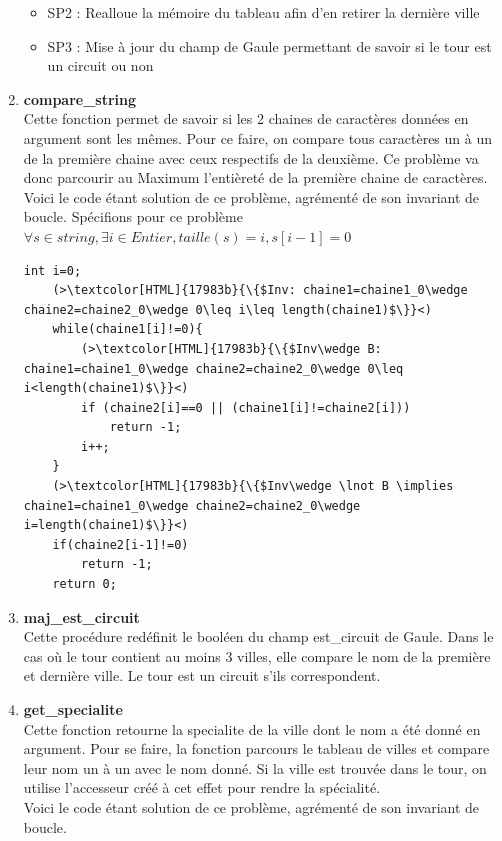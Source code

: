\documentclass[a4paper, 11pt, oneside]{article}
\begin{document}
\begin{enumerate}
\begin{itemize}
        \item SP2 : Realloue la mémoire du tableau afin d'en retirer la dernière ville
        \item SP3 : Mise à jour du champ de Gaule permettant de savoir si le tour est un circuit ou non
    \end{itemize}
    \item \textbf{compare\_string}
    \\Cette fonction permet de savoir si les 2 chaines de caractères données en argument 
    sont les mêmes. Pour ce faire, on compare tous caractères un à un de la première chaine 
    avec ceux respectifs de la deuxième.
    Ce problème va donc parcourir au Maximum l'entièreté de la première chaine de caractères.
    \\Voici le code étant solution de ce problème, agrémenté de son invariant de boucle.
    Spécifions pour ce problème $\forall s\in string, \exists i\in Entier, taille(s)=i, s[i-1]=0$
    \newpage 
    \begin{lstlisting}[caption = {code comparaison de 2 chaines de caractères}]
    int i=0;
    (>\textcolor[HTML]{17983b}{\{$Inv: chaine1=chaine1_0\wedge chaine2=chaine2_0\wedge 0\leq i\leq length(chaine1)$\}}<)
    while(chaine1[i]!=0){
        (>\textcolor[HTML]{17983b}{\{$Inv\wedge B: chaine1=chaine1_0\wedge chaine2=chaine2_0\wedge 0\leq i<length(chaine1)$\}}<)
        if (chaine2[i]==0 || (chaine1[i]!=chaine2[i]))
            return -1;
        i++;
    }
    (>\textcolor[HTML]{17983b}{\{$Inv\wedge \lnot B \implies chaine1=chaine1_0\wedge chaine2=chaine2_0\wedge i=length(chaine1)$\}}<)
    if(chaine2[i-1]!=0)
        return -1;
    return 0;
    \end{lstlisting}
    \item \textbf{maj\_est\_circuit}
    \\Cette procédure redéfinit le booléen du champ est\_circuit de Gaule. Dans le cas où le tour contient
    au moins 3 villes, elle compare le nom de la première et dernière ville. Le tour est un circuit s'ils 
    correspondent.
    \item \textbf{get\_specialite}
    \\Cette fonction retourne la specialite de la ville dont le nom a été donné en argument. Pour se faire, 
    la fonction parcours le tableau de villes et compare leur nom un à un avec le nom donné. Si la 
    ville est trouvée dans le tour, on utilise l'accesseur créé à cet effet pour rendre la spécialité.
    \\Voici le code étant solution de ce problème, agrémenté de son invariant de boucle.

\end{enumerate}
\end{document}
